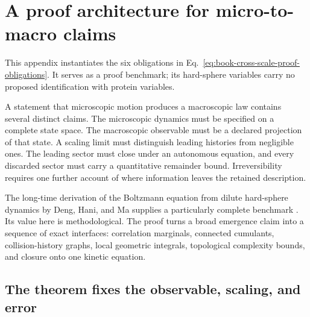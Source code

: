 \section{A proof architecture for micro-to-macro claims}
\label{sec:book-micro-macro-architecture}

This appendix instantiates the six obligations in
Eq.~\ref{eq:book-cross-scale-proof-obligations}.  It serves as a proof benchmark; its hard-sphere
variables carry no proposed identification with protein variables.

A statement that microscopic motion produces a macroscopic law contains several distinct claims.
The microscopic dynamics must be specified on a complete state space.  The macroscopic observable
must be a declared projection of that state.  A scaling limit must distinguish leading histories
from negligible ones.  The leading sector must close under an autonomous equation, and every
discarded sector must carry a quantitative remainder bound.  Irreversibility requires one further
account of where information leaves the retained description.

The long-time derivation of the Boltzmann equation from dilute hard-sphere dynamics by Deng, Hani,
and Ma supplies a particularly complete benchmark \cite{denghani2025boltzmann}.  Its value here is
methodological.  The proof turns a broad emergence claim into a sequence of exact interfaces:
correlation marginals, connected cumulants, collision-history graphs, local geometric integrals,
topological complexity bounds, and closure onto one kinetic equation.

\subsection{The theorem fixes the observable, scaling, and error}

